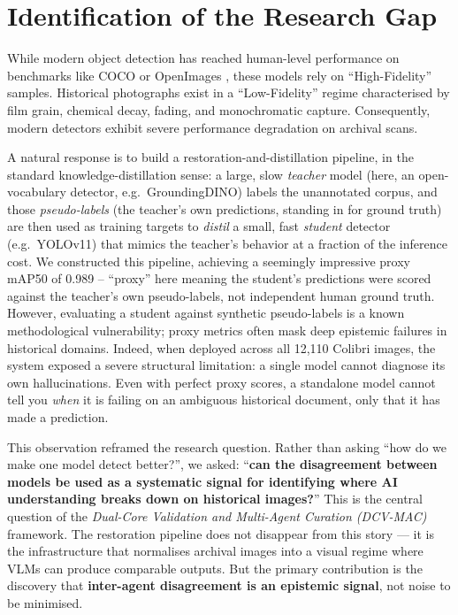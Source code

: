 \documentclass[12pt,a4paper]{report}
\begin{document}
\section{Identification of the Research Gap}
While modern object detection has reached human-level performance on benchmarks like COCO \cite{coco2014} or OpenImages \cite{openimages2020}, these models rely on ``High-Fidelity'' samples. Historical photographs exist in a ``Low-Fidelity'' regime characterised by film grain, chemical decay, fading, and monochromatic capture. Consequently, modern detectors exhibit severe performance degradation on archival scans.

A natural response is to build a restoration-and-distillation pipeline, in the standard knowledge-distillation sense: a large, slow \textit{teacher} model (here, an open-vocabulary detector, e.g.\ GroundingDINO) labels the unannotated corpus, and those \textit{pseudo-labels} (the teacher's own predictions, standing in for ground truth) are then used as training targets to \textit{distil} a small, fast \textit{student} detector (e.g.\ YOLOv11) that mimics the teacher's behavior at a fraction of the inference cost. We constructed this pipeline, achieving a seemingly impressive proxy mAP50 of 0.989 -- ``proxy'' here meaning the student's predictions were scored against the teacher's own pseudo-labels, not independent human ground truth. However, evaluating a student against synthetic pseudo-labels is a known methodological vulnerability; proxy metrics often mask deep epistemic failures in historical domains. Indeed, when deployed across all 12,110 Colibri images, the system exposed a severe structural limitation: a single model cannot diagnose its own hallucinations. Even with perfect proxy scores, a standalone model cannot tell you \textit{when} it is failing on an ambiguous historical document, only that it has made a prediction.

This observation reframed the research question. Rather than asking ``how do we make one model detect better?'', we asked: ``\textbf{can the disagreement between models be used as a systematic signal for identifying where AI understanding breaks down on historical images?}'' This is the central question of the \textit{Dual-Core Validation and Multi-Agent Curation (DCV-MAC)} framework. The restoration pipeline does not disappear from this story --- it is the infrastructure that normalises archival images into a visual regime where VLMs can produce comparable outputs. But the primary contribution is the discovery that \textbf{inter-agent disagreement is an epistemic signal}, not noise to be minimised.
\end{document}
